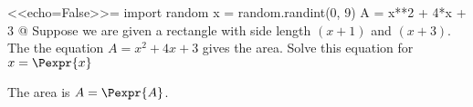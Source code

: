 <<echo=False>>=
import random
x = random.randint(0, 9)
A = x**2 + 4*x + 3
@
Suppose we are given a rectangle with side length $(x+1)$ and $(x+3)$. The the equation $A=x^2+4x+3$ gives the area.
Solve this equation for $x=\Pexpr{x}$
\vspace{2in}
\begin{solution}
    The area is $A=\Pexpr{A}$.
\end{solution}